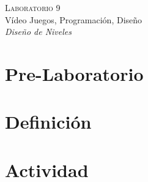 \begin{center}
\textsc{\Large Laboratorio 9}~\\
{\large Vídeo Juegos, Programación, Diseño}~\\
\emph{Diseño de Niveles}
\end{center}

\section{Pre-Laboratorio}

\section{Definición}


\section{Actividad}
